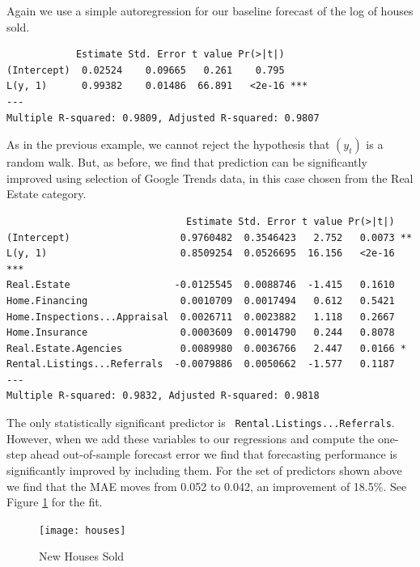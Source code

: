 \documentclass[12pt, oneside]{article}
\begin{document}
Again we use a simple autoregression for our baseline forecast of the
log of houses sold.

\small
\begin{verbatim}
            Estimate Std. Error t value Pr(>|t|)    
(Intercept)  0.02524    0.09665   0.261    0.795    
L(y, 1)      0.99382    0.01486  66.891   <2e-16 ***
---
Multiple R-squared: 0.9809,	Adjusted R-squared: 0.9807 
\end{verbatim}
\normalsize

As in the previous example, we cannot reject the hypothesis that
$(y_t)$ is a random walk.  But, as before, we find that prediction can
be significantly improved using selection of Google Trends data, in
this case chosen from the Real Estate category.

\small
\begin{verbatim}
                               Estimate Std. Error t value Pr(>|t|)    
(Intercept)                   0.9760482  0.3546423   2.752   0.0073 ** 
L(y, 1)                       0.8509254  0.0526695  16.156   <2e-16 ***
Real.Estate                  -0.0125545  0.0088746  -1.415   0.1610    
Home.Financing                0.0010709  0.0017494   0.612   0.5421    
Home.Inspections...Appraisal  0.0026711  0.0023882   1.118   0.2667    
Home.Insurance                0.0003609  0.0014790   0.244   0.8078    
Real.Estate.Agencies          0.0089980  0.0036766   2.447   0.0166 *  
Rental.Listings...Referrals  -0.0079886  0.0050662  -1.577   0.1187    
---
Multiple R-squared: 0.9832,	Adjusted R-squared: 0.9818 
\end{verbatim}
\normalsize

The only statistically significant predictor is {\tt
  Rental.Listings...Referrals}.  However, when we add these variables
to our regressions and compute the one-step ahead out-of-sample
forecast error we find that forecasting performance is significantly
improved by including them.  For the set of predictors shown above we
find that the MAE moves from 0.052 to 0.042, an improvement of 18.5\%.
See Figure \ref{Fig:houses} for the fit.

\begin{figure}[ht]
\begin{center}
\texttt{[image: houses]}
\caption{\label{Fig:houses} New Houses Sold} 
\end{center}
\end{figure}
\end{document}
